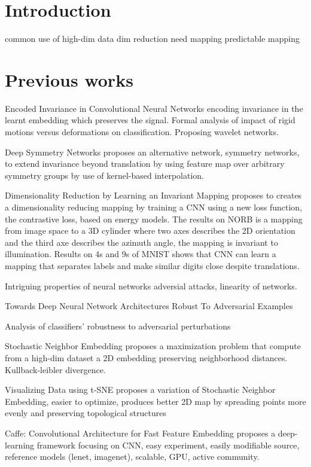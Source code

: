 \documentclass[a4paper,12pt]{article}
\begin{document}
\begin{abstract}
\end{abstract}

\section{Introduction}
common use of high-dim data
dim reduction
need mapping
predictable mapping

\section{Previous works}
Encoded Invariance in Convolutional Neural Networks
encoding invariance in the learnt embedding which preserves the signal. Formal analysis of impact of rigid motions versus deformations on classification. Proposing wavelet networks.

Deep Symmetry Networks
proposes an alternative network, symmetry networks, to extend invariance beyond translation by using feature map over arbitrary symmetry groups by use of kernel-based interpolation.

Dimensionality Reduction by Learning an Invariant Mapping
proposes to creates a dimensionality reducing mapping by training a CNN using a new loss function, the contrastive loss, based on energy models. The results on NORB is a mapping from image space to a 3D cylinder where two axes describes the 2D orientation and the third axe describes the azimuth angle, the mapping is invariant to illumination. Results on 4s and 9s of MNIST shows that CNN can learn a mapping that separates labels and make similar digits close despite translations.

Intriguing properties of neural networks
adversial attacks, linearity of networks.

Towards Deep Neural Network Architectures Robust To Adversarial Examples

Analysis of classifiers' robustness to adversarial perturbations

Stochastic Neighbor Embedding
proposes a maximization problem that compute from a high-dim dataset a 2D embedding preserving neighborhood distances. Kullback-leibler divergence.

Visualizing Data using t-SNE
proposes a variation of Stochastic Neighbor Embedding, easier to optimize, produces better 2D map by spreading points more evenly and preserving topological structures

Caffe: Convolutional Architecture for Fast Feature Embedding
proposes a deep-learning framework focusing on CNN, easy experiment, easily modifiable source, reference models (lenet, imagenet), scalable, GPU, active community.
\end{document}
